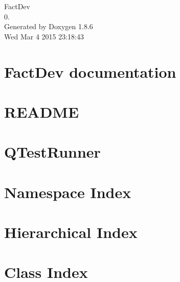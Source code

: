 \documentclass[twoside]{book}
\newcommand{\clearemptydoublepage}{%
  \newpage{\pagestyle{empty}\cleardoublepage}%
}
\begin{document}
\hypersetup{pageanchor=false}
\begin{titlepage}
\vspace*{7cm}
\begin{center}%
{\Large Fact\-Dev \\[1ex]\large 0. }\\
\vspace*{1cm}
{\large Generated by Doxygen 1.8.6}\\
\vspace*{0.5cm}
{\small Wed Mar 4 2015 23:18:43}\\
\end{center}
\end{titlepage}
\clearemptydoublepage
\tableofcontents
\clearemptydoublepage
{}
\hypersetup{pageanchor=true}

\chapter{Fact\-Dev documentation}
\label{index}\hypertarget{index}{}
\chapter{R\-E\-A\-D\-M\-E}
\label{da/d07/md__home_travis_build_FACT-Team_FactDev_src_libs_qt-mustache_README}
\hypertarget{da/d07/md__home_travis_build_FACT-Team_FactDev_src_libs_qt-mustache_README}{}

\chapter{Q\-Test\-Runner}
\label{d7/d95/md__home_travis_build_FACT-Team_FactDev_tests_QTestRunner_README}
\hypertarget{d7/d95/md__home_travis_build_FACT-Team_FactDev_tests_QTestRunner_README}{}

\chapter{Namespace Index}

\chapter{Hierarchical Index}

\chapter{Class Index}

\end{document}
